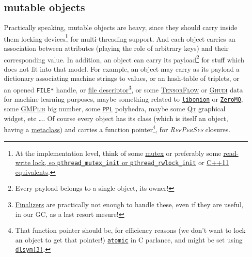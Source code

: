 \documentclass[11pt,a4paper,svgnames]{article}
\newcommand{\RefPerSys}{{\textit{\textsc{RefPerSys}}}}
\begin{document}
\subsection{mutable objects}
\label{subsec:mutable-objects}

Practically speaking, mutable objects are heavy, since they should
carry inside them locking devices\footnote{At the implementation
level, think of some
\href{https://computing.llnl.gov/tutorials/pthreads/\#Mutexes}{mutex}
or preferably some
\href{http://tuxthink.blogspot.com/2013/02/using-read-write-lock-in-pthreads.html}{read-write
  lock, so
  \href{https://pubs.opengroup.org/onlinepubs/7908799/xsh/pthread\_mutex\_init.html}{\texttt{pthread\_mutex\_init}}
  or
  \href{https://pubs.opengroup.org/onlinepubs/7908799/xsh/pthread_rwlock_init.html}{\texttt{pthread\_rwlock\_init}}}
or \href{https://en.cppreference.com/w/cpp/thread}{C++11
  equivalents}.} for multi-threading support. And each object carries
an association between attributes (playing the role of arbitrary keys)
and their corresponding value. In addition, an object can carry its
payload\footnote{Every payload belongs to a single object, its owner!}
for stuff which does not fit into that model. For example, an object
may carry as its payload a dictionary associating machine strings to
values, or an hash-table of triplets, or an opened \texttt{FILE*}
handle, or \href{https://en.wikipedia.org/wiki/File\_descriptor}{file
  descriptor}\footnote{\href{https://en.wikipedia.org/wiki/Finalizer}{Finalizers}
are practically not enough to handle these, even if they are useful,
in our GC, as a last resort mesure!}, or some
\href{https://www.tensorflow.org/}{\textsc{TensorFlow}} or
\href{https://gudhi.inria.fr/}{\textsc{Ghudi}} data for machine
learning purposes, maybe something related to
\href{https://github.com/davidmoreno/onion/}{\texttt{libonion}} or
\href{http://zeromq.org}{\texttt{ZeroMQ}}, some
\href{https://gmplib.org/}{\textsc{GMPlib}} big number, some
\href{https://www.bugseng.com/ppl}{\texttt{PPL}} polyhedra, maybe some
\href{http://qt.io/}{\textsc{Qt}} graphical widget, etc \ldots. Of
course every object has its class (which is itself an object, having a
\href{https://en.wikipedia.org/wiki/Metaclass}{metaclass}) and carries
a function pointer\footnote{That function pointer should be, for
efficiency reasons (we don't want to lock an object to get that
pointer!)
\href{https://en.cppreference.com/w/c/atomic}{\texttt{atomic}} in C
parlance, and might be set using
\href{http://man7.org/linux/man-pages/man3/dlsym.3.html}{\texttt{dlsym(3)}}.}, for {\RefPerSys} closures.
\end{document}
